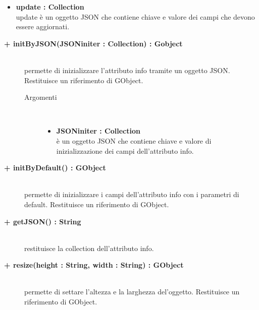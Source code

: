 \begin{description}
\begin{description}
\begin{description}
\begin{itemize}
					\item \textbf{update : Collection			} \hfill \\
					update è un oggetto JSON che contiene chiave e valore dei campi che devono essere aggiornati. 
				\end{itemize}
		\end{description}

\end{description}

\begin{description}
		\item[\textbf{\color{blue}+ initByJSON(JSONiniter : Collection) : Gobject			}] \hfill \\
			permette di inizializzare l'attributo info tramite un oggetto JSON. Restituisce un riferimento di GObject. 
			
		\begin{description}
			\item[Argomenti] \hfill \\
				\begin{itemize}
				
					\item \textbf{JSONiniter : Collection			} \hfill \\
					è un oggetto JSON che contiene chiave e valore di inizializzazione dei campi dell'attributo info. 
				\end{itemize}
		\end{description}

\end{description}

\begin{description}
		\item[\textbf{\color{blue}+ initByDefault() : GObject			}] \hfill \\
			permette di inizializzare i campi dell'attributo info con i parametri di default. Restituisce un riferimento di GObject.

\end{description}

\begin{description}
		\item[\textbf{\color{blue}+ getJSON() : String			}] \hfill \\
			restituisce la collection dell'attributo info.

\end{description}

\begin{description}
		\item[\textbf{\color{blue}+ resize(height : String, width : String) : GObject			}] \hfill \\
			permette di settare l'altezza e la larghezza del'oggetto. Restituisce un riferimento di GObject.
			

\end{description}
\end{description}

